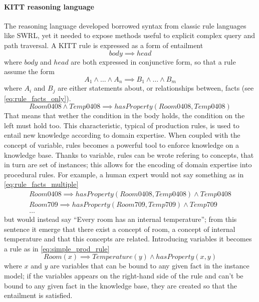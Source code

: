 \paragraph{KITT reasoning language}
The reasoning language developed borrowed syntax from classic rule languages like SWRL, yet it needed to expose methods useful to explicit complex query and path traversal. A KITT rule is expressed as a form of entailment \[body\implies head\] where $body$ and $head$ are both expressed in conjunctive form, so that a rule assume the form \[A_1\land\ldots\land A_n\implies B_1\land\ldots\land B_m\] where $A_i$ and $B_j$ are either statements about, or relationships between, facts (see \autoref{eq:rule_facts_only}).
\begin{equation}
\label{eq:rule_facts_only}
Room0408\land Temp0408\implies hasProperty(Room0408, Temp0408)
\end{equation}
That means that wether the condition in the body holds, the condition on the left must hold too. This characteristic, typical of production rules, is used to entail new knowledge according to domain expertise. When coupled with the concept of variable, rules becomes a powerful tool to enforce knowledge on a knowledge base. Thanks to variable, rules can be wrote refering to concepts, that in turn are set of instances; this allows for the encoding of domain expertise into procedural rules. For example, a human expert would not say something as in \ref{eq:rule_facts_multiple}
\begin{equation}
\label{eq:rule_facts_multiple}
\begin{gathered}
Room0408\implies hasProperty(Room0408, Temp0408)\land Temp0408\\
Room709\implies hasProperty(Room709, Temp709)\land Temp709\\
\dots
\end{gathered}
\end{equation}
but would instead say ``Every room has an internal temperature''; from this sentence it emerge that there exist a concept of room, a concept of internal temperature and that this concepts are related. Introducing variables it becomes a rule as in \autoref{eq:simple_prod_rule}
\begin{equation}
\label{eq:simple_prod_rule}
Room(x)\implies Temperature(y)\land hasProperty(x,y)
\end{equation}
where $x$ and $y$ are variables that can be bound to any given fact in the instance model; if the variables appears on the right-hand side of the rule and can't be bound to any given fact in the knowledge base, they are created so that the entailment is satisfied.
